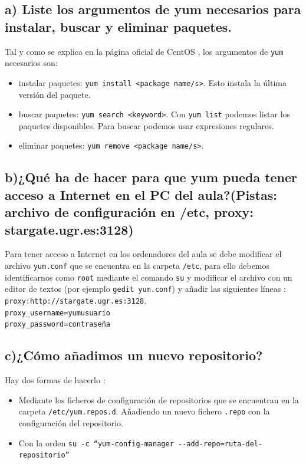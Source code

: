 \subsection{a) Liste los argumentos de yum necesarios para instalar, buscar y eliminar paquetes.}

Tal y como se explica en la página oficial de CentOS \cite{yum}, los argumentos de \texttt{yum} necesarios son:
\begin{itemize}
	\item instalar paquetes: \texttt{yum install <package name/s>}. Esto instala la última versión del paquete.
	\item buscar paquetes: \texttt{yum search <keyword>}. Con \texttt{yum list} podemos listar los   paquetes   disponibles.   Para buscar podemos usar expresiones regulares.
	\item eliminar paquetes: \texttt{yum remove <package name/s>}.
\end{itemize}

\subsection{b)¿Qué ha de hacer para que yum pueda tener acceso a Internet en el PC del aula?(Pistas: archivo de configuración en /etc, proxy: stargate.ugr.es:3128)}

Para tener acceso a Internet en los ordenadores del aula se debe modificar el archivo \texttt{yum.conf} que se encuentra en la carpeta \texttt{/etc}, para ello debemos identificarnos como \texttt{root} mediante el comando \texttt{su} y modificar el archivo con un editor de textos (por ejemplo \texttt{gedit yum.conf}) y añadir las siguientes líneas \cite{yumProxy}:\\

\texttt{proxy:http://stargate.ugr.es:3128}.\\
\texttt{proxy\_username=yum\-usuario}\\
\texttt{proxy\_password=contraseña}\\



\subsection{c)¿Cómo añadimos un nuevo repositorio?}

Hay dos formas de hacerlo \cite{yumRepository}:
\begin{itemize}
	\item Mediante los ficheros de configuración de repositorios que se encuentran en la carpeta \texttt{/etc/yum.repos.d}. Añadiendo un nuevo fichero \texttt{.repo} con la configuración del repositorio.
	\item Con la orden \texttt{su -c ``yum-config-manager -{}-add-repo=ruta-del-repositorio''}
\end{itemize}


